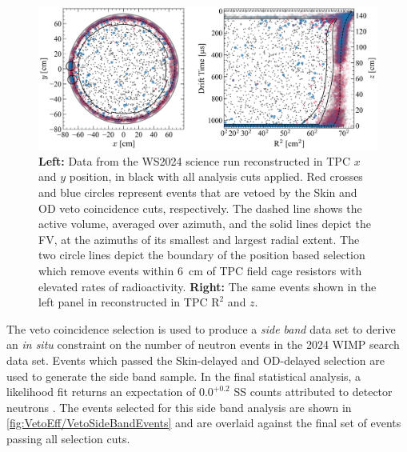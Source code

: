 \begin{figure}[ht!]
    \centering
    \includegraphics[width=\linewidth]{figures/VetoEfficiency/WS2024_TPCPosPlots_2panel.png}
    \caption{\textbf{Left:} Data from the WS2024 science run reconstructed in TPC $x$ and $y$ position, in black with all analysis cuts applied. Red crosses and blue circles represent events that are vetoed by the Skin and OD veto coincidence cuts, respectively. The dashed line shows the active volume, averaged over azimuth, and the solid lines depict the FV, at the azimuths of its smallest and largest radial extent. The two circle lines depict the boundary of the position based selection which remove events within 6~cm of TPC field cage resistors with elevated rates of radioactivity. \textbf{Right:} The same events shown in the left panel in reconstructed in TPC $\text{R}^2$ and $z$.}
    \label{fig:VetoEff/WS2024_TPCPosPlots_2panel}
\end{figure}

The veto coincidence selection is used to produce a \textit{side band} data set to derive an \textit{in situ} constraint on the number of neutron events in the 2024 WIMP search data set. Events which passed the Skin-delayed and OD-delayed selection are used to generate the side band sample. In the final statistical analysis, a likelihood fit returns an expectation of $0.0^{+0.2}$ SS counts attributed to detector neutrons \cite{LZCollaboration:2024lux}. The events selected for this side band analysis are shown in \autoref{fig:VetoEff/VetoSideBandEvents} and are overlaid against the final set of events passing all selection cuts. 

